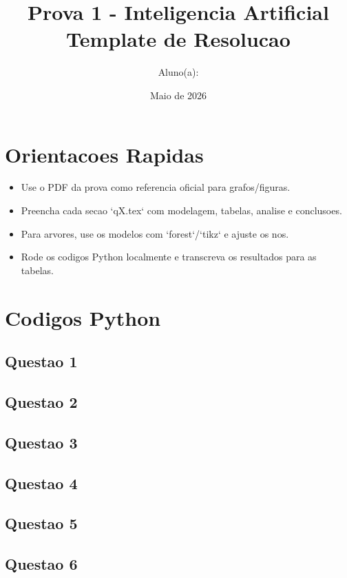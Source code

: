 \documentclass[12pt,a4paper]{article}
\title{Prova 1 - Inteligencia Artificial\\Template de Resolucao}
\author{Aluno(a): \underline{\hspace{7cm}}}
\date{Maio de 2026}
\begin{document}
\maketitle
\tableofcontents
\newpage

\section*{Orientacoes Rapidas}
\begin{itemize}[leftmargin=1.5em]
  \item Use o PDF da prova como referencia oficial para grafos/figuras.
  \item Preencha cada secao `qX.tex` com modelagem, tabelas, analise e conclusoes.
  \item Para arvores, use os modelos com `forest`/`tikz` e ajuste os nos.
  \item Rode os codigos Python localmente e transcreva os resultados para as tabelas.
\end{itemize}








\appendix
\section{Codigos Python}

\subsection{Questao 1}


\subsection{Questao 2}


\subsection{Questao 3}


\subsection{Questao 4}


\subsection{Questao 5}


\subsection{Questao 6}

\end{document}

